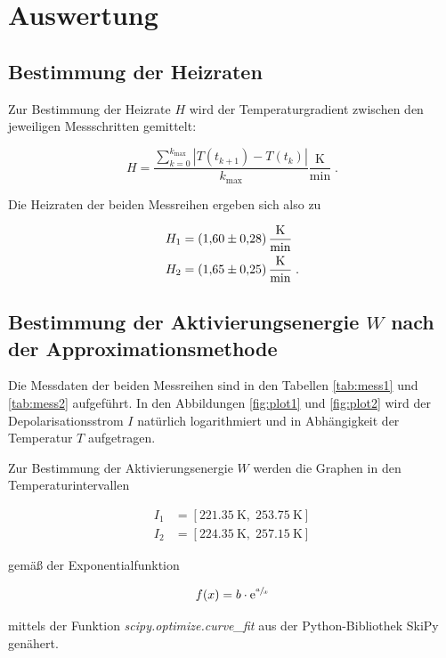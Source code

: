 \section{Auswertung}
\label{sec:Auswertung}

\subsection{Bestimmung der Heizraten}

Zur Bestimmung der Heizrate $H$ wird der Temperaturgradient zwischen den jeweiligen Messschritten gemittelt:

\begin{equation}
  H = \frac{ \sum_{k=0}^{k_\text{max}} |T(t_{k+1}) - T(t_k)|}{k_\text{max}} \frac{\si{\kelvin}}{\si{\minute}} \; .
\end{equation}

Die Heizraten der beiden Messreihen ergeben sich also zu

\begin{align*}
  H_1 &= \SI{1.60 +- 0.28}{\kelvin\per\minute} \\
  H_2 &= \SI{1.65 +- 0.25}{\kelvin\per\minute} \; .
\end{align*}

\subsection{Bestimmung der Aktivierungsenergie $W$ nach der Approximationsmethode}

Die Messdaten der beiden Messreihen sind in den Tabellen \ref{tab:mess1} und \ref{tab:mess2} aufgeführt.
In den Abbildungen \ref{fig:plot1} und \ref{fig:plot2} wird der Depolarisationsstrom $I$ natürlich logarithmiert und in Abhängigkeit der Temperatur $T$
aufgetragen.

Zur Bestimmung der Aktivierungsenergie $W$ werden die Graphen in den Temperaturintervallen

\begin{align*}
  I_1 &= [\SI{221.35}{\kelvin}, \; \SI{253.75}{\kelvin}] \\
  I_2 &= [\SI{224.35}{\kelvin}, \; \SI{257.15}{\kelvin}]
\end{align*}

gemäß der Exponentialfunktion 

\begin{equation}
  f(x) = b \cdot \text{e}^{\sfrac{a}{x}}
\end{equation}

mittels der Funktion \textit{scipy.optimize.curve\_fit} aus der Python-Bibliothek SkiPy genähert.

